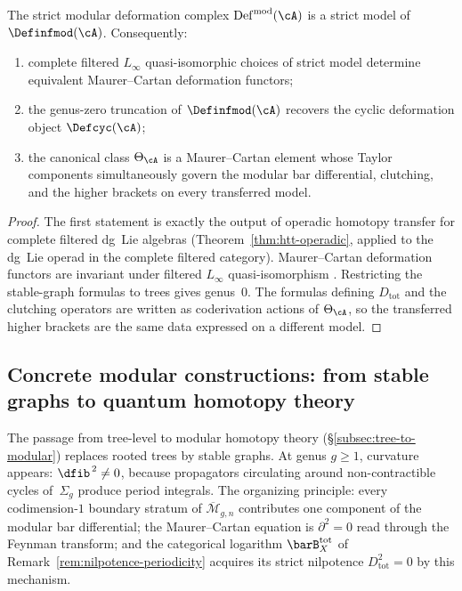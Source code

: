 \begin{proposition}
\label{prop:modular-strictification-principle}
The strict modular deformation complex
$\operatorname{Def}^{\mathrm{mod}}(\cA)$ is a strict model
of $\Definfmod(\cA)$. Consequently:
\begin{enumerate}[label=\textup{(\roman*)}]
\item complete filtered $L_\infty$ quasi-isomorphic choices of strict
 model determine equivalent Maurer--Cartan deformation functors;
\item the genus-zero truncation of
 $\Definfmod(\cA)$ recovers the cyclic
 deformation object $\Defcyc(\cA)$;
\item the canonical class $\Theta_\cA$ is a Maurer--Cartan element whose
 Taylor components simultaneously govern the modular bar differential,
 clutching, and the higher brackets on every transferred model.
\end{enumerate}
\end{proposition}

\begin{proof}
The first statement is exactly the output of operadic homotopy transfer
for complete filtered dg~Lie algebras
(Theorem~\ref{thm:htt-operadic}, applied to the dg~Lie operad in the
complete filtered category).
Maurer--Cartan deformation functors are invariant under filtered
$L_\infty$ quasi-isomorphism
\cite{KontsevichSoibelman,Get09}. Restricting the stable-graph
formulas to trees gives genus~$0$. The formulas defining
$D_{\mathrm{tot}}$ and the clutching operators are written as
coderivation actions of $\Theta_\cA$, so the transferred higher
brackets are the same data expressed on a different model.
\end{proof}

\subsection{Concrete modular constructions: from stable graphs to quantum homotopy theory}
\label{subsec:concrete-modular-constructions}

The passage from tree-level to modular homotopy theory
(\S\ref{subsec:tree-to-modular}) replaces rooted trees by stable
graphs. At genus $g \geq 1$, curvature appears:
$\dfib^{\,2} \neq 0$, because propagators circulating around
non-contractible cycles of~$\Sigma_g$ produce period integrals.
The organizing principle: every codimension-$1$ boundary stratum of
$\overline{\mathcal{M}}_{g,n}$ contributes one component of the
modular bar differential; the Maurer--Cartan equation is $\partial^2
= 0$ read through the Feynman transform; and the categorical
logarithm $\barB^{\mathrm{tot}}_X$ of
Remark~\ref{rem:nilpotence-periodicity} acquires its strict
nilpotence $D_{\mathrm{tot}}^2 = 0$ by this mechanism.

